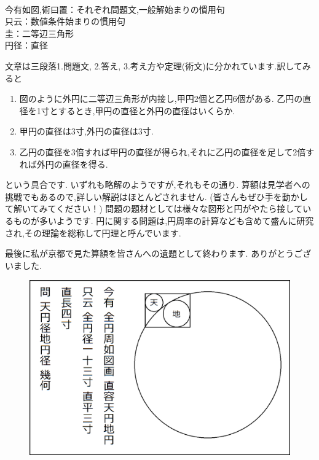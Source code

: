\documentclass[./main]{subfiles}
\begin{document}
\begin{flushleft}
[用語] \\
今有如図,術曰置：それぞれ問題文,一般解始まりの慣用句 \\
只云：数値条件始まりの慣用句 \\
圭：二等辺三角形 \\
円径：直径
\end{flushleft}

文章は三段落1.問題文, 2.答え, 3.考え方や定理(術文)に分かれています.訳してみると

\begin{enumerate}
\item 図のように外円に二等辺三角形が内接し,甲円2個と乙円6個がある. 乙円の直径を1寸とするとき,甲円の直径と外円の直径はいくらか.
\item 甲円の直径は3寸,外円の直径は3寸.
\item 乙円の直径を3倍すれば甲円の直径が得られ,それに乙円の直径を足して2倍すれば外円の直径を得る.
\end{enumerate}
という具合です. いずれも略解のようですが,それもその通り. 算額は見学者への挑戦でもあるので,詳しい解説はほとんどされません. (皆さんもぜひ手を動かして解いてみてください！)
問題の題材としては様々な図形と円がやたら接しているものが多いようです. 円に関する問題は,円周率の計算なども含めて盛んに研究され,その理論を総称して円理と呼んでいます.

最後に私が京都で見た算額を皆さんへの遺題として終わります. ありがとうございました.

\begin{figure}[H]
\begin{center}
\includegraphics[width=13cm,bb=0 0 1155 777]{ookuwa4.png}
\end{center}
\end{figure}
\end{document}
